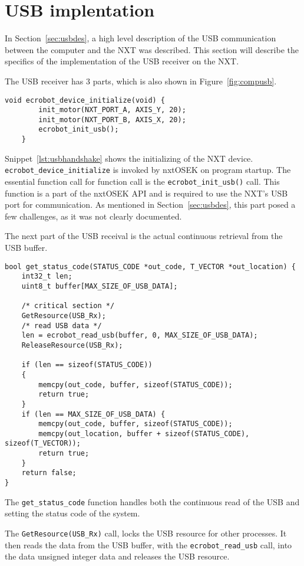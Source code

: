 \section{USB implentation}
\label{sec:usbimp}
In Section~\ref{sec:usbdes}, a high level description of the USB communication between the computer and the NXT was described.
This section will describe the specifics of the implementation of the USB receiver on the NXT.

The USB receiver has 3 parts, which is also shown in Figure~\ref{fig:compusb}.

\begin{lstlisting}[language=CSharp,label={lst:usbhandshake},caption={ecrobot\_device\_initialize method from nxt.c}]
    void ecrobot_device_initialize(void) {
        init_motor(NXT_PORT_A, AXIS_Y, 20);
        init_motor(NXT_PORT_B, AXIS_X, 20);
        ecrobot_init_usb();
    }
\end{lstlisting}
Snippet~\ref{lst:usbhandshake} shows the initializing of the NXT device.
\texttt{ecrobot\_device\_initialize} is invoked by nxtOSEK on program startup.
The essential function call for function call is the \texttt{ecrobot\_init\_usb()} call.
This function is a part of the nxtOSEK API and is required to use the NXT's USB port for communication.
As mentioned in Section~\ref{sec:usbdes}, this part posed a few challenges, as it was not clearly documented.

The next part of the USB receival is the actual continuous retrieval from the USB buffer.
\begin{lstlisting}[language=CSharp,label={lst:usbreceive},caption={get\_status\_code method from usb.c}]
bool get_status_code(STATUS_CODE *out_code, T_VECTOR *out_location) {
	int32_t len;
	uint8_t buffer[MAX_SIZE_OF_USB_DATA];

	/* critical section */
	GetResource(USB_Rx);
	/* read USB data */
	len = ecrobot_read_usb(buffer, 0, MAX_SIZE_OF_USB_DATA);
	ReleaseResource(USB_Rx);

	if (len == sizeof(STATUS_CODE))
	{
		memcpy(out_code, buffer, sizeof(STATUS_CODE));
		return true;
	}
	if (len == MAX_SIZE_OF_USB_DATA) {
		memcpy(out_code, buffer, sizeof(STATUS_CODE));
		memcpy(out_location, buffer + sizeof(STATUS_CODE), sizeof(T_VECTOR));
		return true;
	}
	return false;
}
\end{lstlisting}
The \texttt{get\_status\_code} function handles both the continuous read of the USB and setting the status code of the system.

The \texttt{GetResource(USB\_Rx)} call, locks the USB resource for other processes.
It then reads the data from the USB buffer, with the \texttt{ecrobot\_read\_usb} call, into the data unsigned integer data and releases the USB resource.

